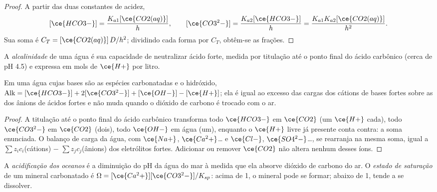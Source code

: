 \begin{proof}
A partir das duas constantes de acidez,
\[
  [\ce{HCO3-}] = \frac{K_{a1}[\ce{CO2(aq)}]}{h}, \qquad [\ce{CO3^2-}] = \frac{K_{a2}[\ce{HCO3-}]}{h} = \frac{K_{a1}K_{a2}[\ce{CO2(aq)}]}{h^2}.
\]
Sua soma é $C_T = [\ce{CO2(aq)}]\,D/h^2$; dividindo cada forma por $C_T$, obtêm-se as frações.
\end{proof}

\begin{definition}[Alcalinidade]\label{def:b3:environmental-toxicology:alkalinity}
A \emph{alcalinidade} de uma água é sua capacidade de neutralizar
ácido forte, medida por titulação até o ponto final do ácido carbônico (cerca de pH
4.5) e expressa em mols de $\ce{H+}$ por litro.
\end{definition}

\begin{proposition}\label{prop:b3:environmental-toxicology:alkalinity}
Em uma água cujas bases são as espécies carbonatadas e o hidróxido,
$\mathrm{Alk} = [\ce{HCO3-}] + 2[\ce{CO3^2-}] + [\ce{OH-}] - [\ce{H+}]$; ela é igual ao excesso das cargas dos cátions de bases fortes
sobre as dos ânions de ácidos fortes e não muda quando o dióxido de carbono
é trocado com o ar.
\end{proposition}

\begin{proof}
A titulação até o ponto final do ácido carbônico transforma todo $\ce{HCO3-}$ em $\ce{CO2}$ (um $\ce{H+}$ cada),
todo $\ce{CO3^2-}$ em $\ce{CO2}$ (dois), todo $\ce{OH-}$ em água (um), enquanto o $\ce{H+}$ livre já presente
conta contra: a soma enunciada. O balanço de carga da água, com
$\ce{Na+}$, $\ce{Ca^2+}$\dots{} e $\ce{Cl-}$, $\ce{SO4^2-}$\dots, se rearranja na mesma soma, igual a $\sum z_i c_i$(cátions) $-$ $\sum z_jc_j$(ânions)
dos eletrólitos fortes. Adicionar ou remover $\ce{CO2}$ não altera nenhum desses íons.
\end{proof}

\begin{definition}\label{def:b3:environmental-toxicology:acidification}
A \emph{acidificação dos oceanos} é a diminuição do
pH da água do mar à medida que ela absorve dióxido de carbono do ar. O \emph{estado de
saturação} de um mineral carbonatado é
$\Omega = [\ce{Ca^2+}][\ce{CO3^2-}]/K_{sp}$: acima de 1, o mineral pode se formar; abaixo de 1, tende a se dissolver.
\end{definition}

